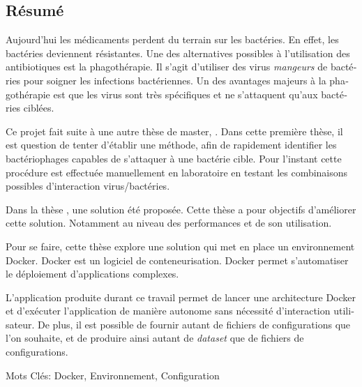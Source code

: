 \begin{otherlanguage}{french}
\cleardoublepage
\chapter*{Résumé}

Aujourd'hui les médicaments perdent du terrain sur les bactéries. En effet, les bactéries deviennent résistantes. Une des alternatives possibles à l'utilisation des antibiotiques est la phagothérapie. Il s'agit d'utiliser des virus \emph{mangeurs} de bactéries pour soigner les infections bactériennes. Un des avantages majeurs à la phagothérapie est que les virus sont très spécifiques et ne s'attaquent qu'aux bactéries ciblées. 

Ce projet fait suite à une autre thèse de master, \thLeite . Dans cette première thèse, il est question de tenter d'établir une méthode, afin de rapidement identifier les bactériophages capables de s'attaquer à une bactérie cible. Pour l'instant cette procédure est effectuée manuellement en laboratoire en testant les combinaisons possibles d'interaction virus/bactéries.

Dans la thèse \thLeite , une solution été proposée. Cette thèse a pour objectifs d'améliorer cette solution. Notamment au niveau des performances et de son utilisation.

Pour se faire, cette thèse explore une solution qui met en place un environnement Docker. Docker est un logiciel de conteneurisation. Docker permet s'automatiser le déploiement d'applications complexes.

L'application produite durant ce travail permet de lancer une architecture Docker et d'exécuter l'application de manière autonome sans nécessité d'interaction utilisateur. De plus, il est possible de fournir autant de fichiers de configurations que l'on souhaite, et de produire ainsi autant de \emph{dataset} que de fichiers de configurations.

Mots Clés: Docker, Environnement, Configuration
\end{otherlanguage}


